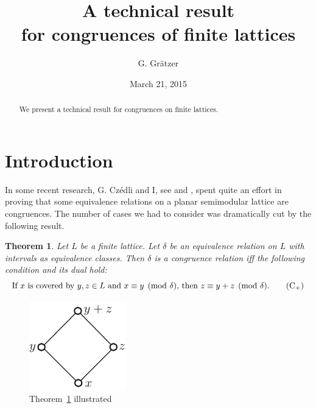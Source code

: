 \documentclass{amsart}
\newtheorem{theorem}{Theorem}
\begin{document}
\title{A technical result\\ for congruences of finite lattices}  
\author{G. Gr\"{a}tzer} 
\address{Department of Mathematics\\
  University of Manitoba\\
  Winnipeg, MB R3T 2N2\\
  Canada}
\date{March 21, 2015}
\begin{abstract}
We present a technical result
for congruences on finite lattices.
\end{abstract}
\maketitle

\section{Introduction}\label{S:Introduction}%
In some recent research, G. Cz\'edli
and I, see \cite{gC13} and \cite{GS13}, spent quite an effort
in proving that some equivalence relations 
on a planar semimodular lattice are congruences. 
The number of cases we had to consider
was dramatically cut by the following result.

\begin{theorem}\label{T:technical}%
Let $L$ be a finite lattice. 
Let $\delta$ be an equivalence relation on $L$
with intervals as equivalence classes.
Then $\delta$ is a congruence relation if{}f 
the following condition and its dual hold:
\begin{equation}\label{E:cover}%
\text{If $x$ is covered by $y,z \in L$ 
and $x \equiv y \pmod{\delta}$,
then $z \equiv y + z \pmod{\delta}$.}\tag{C${}_{+}$}
\end{equation}
\end{theorem}

\begin{figure}[hbt]
\centerline{\includegraphics{covers}}
\caption{Theorem~\ref{T:technical} illustrated}\label{T:Theorem}
\end{figure}
\end{document}
